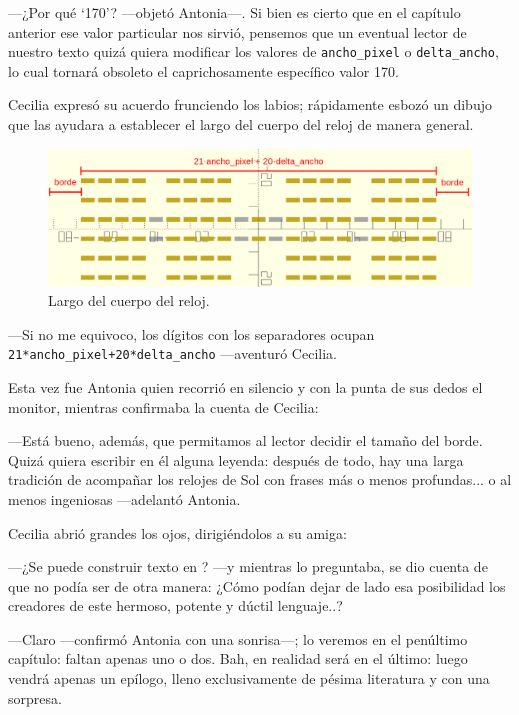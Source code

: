 ---¿Por qué `170'? ---objetó Antonia---. Si bien es cierto que en el
capítulo anterior ese valor particular nos sirvió, pensemos que un
eventual lector de nuestro texto quizá quiera modificar los valores de
\lstinline!ancho_pixel! o \lstinline!delta_ancho!, lo cual tornará
obsoleto el caprichosamente específico valor 170.

Cecilia expresó su acuerdo frunciendo los labios; rápidamente esbozó
un dibujo que las ayudara a establecer el largo del cuerpo del reloj
de manera general.

\begin{figure}[ht]
  \centering
  \includegraphics[width=1\textwidth]{imagenes/horas-minutos-largo}
  \caption{Largo del cuerpo del reloj.}
  \label{fig:horas-minutos-largo}
\end{figure} 


---Si no me equivoco, los dígitos con los separadores ocupan
\lstinline!21*ancho_pixel+20*delta_ancho! ---aventuró Cecilia.

Esta vez fue Antonia quien recorrió en silencio y con la punta de sus
dedos el monitor, mientras confirmaba la cuenta de Cecilia:

---Está bueno, además, que permitamos al lector decidir el tamaño del
borde. Quizá quiera escribir en él alguna leyenda: después de todo,
hay una larga tradición de acompañar los relojes de Sol con frases más
o menos profundas... o al menos ingeniosas ---adelantó Antonia.

Cecilia abrió grandes los ojos, dirigiéndolos a su amiga:

---¿Se puede construir texto en \openscad? ---y mientras lo
preguntaba, se dio cuenta de que no podía ser de otra manera: ¿Cómo
podían dejar de lado esa posibilidad los creadores de este hermoso,
potente y dúctil lenguaje..?

---Claro ---confirmó Antonia con una sonrisa---; lo veremos en el
penúltimo capítulo: faltan apenas uno o dos. Bah, en realidad será en
el último: luego vendrá apenas un epílogo, lleno exclusivamente de
pésima literatura y con una sorpresa.

